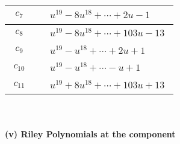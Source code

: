 \documentclass[1p]{elsarticle_modified}
\theoremstyle{definition}
\begin{document}
\begin{tabular}{m{50pt}|m{274pt}}
\hline $$\begin{aligned}c_{7}\end{aligned}$$&$\begin{aligned}
&u^{19}-8 u^{18}+\cdots+2 u-1
\end{aligned}$\\
\hline $$\begin{aligned}c_{8}\end{aligned}$$&$\begin{aligned}
&u^{19}-8 u^{18}+\cdots+103 u-13
\end{aligned}$\\
\hline $$\begin{aligned}c_{9}\end{aligned}$$&$\begin{aligned}
&u^{19}- u^{18}+\cdots+2 u+1
\end{aligned}$\\
\hline $$\begin{aligned}c_{10}\end{aligned}$$&$\begin{aligned}
&u^{19}- u^{18}+\cdots- u+1
\end{aligned}$\\
\hline $$\begin{aligned}c_{11}\end{aligned}$$&$\begin{aligned}
&u^{19}+8 u^{18}+\cdots+103 u+13
\end{aligned}$\\
\hline
\end{tabular}\\~\\
\newpage\renewcommand{\arraystretch}{1}
\flushleft \textbf{(v) Riley Polynomials at the component}\newline \\
\end{document}
